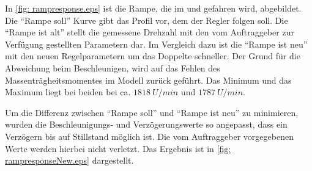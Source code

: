 \documentclass[./\jobname.tex]{subfiles}
\begin{document}
%
In \autoref{fig: rampresponse.eps} ist die Rampe, die im \modeA und \modeB gefahren wird, abgebildet. Die \enquote{Rampe soll} Kurve gibt das Profil vor, dem der Regler folgen soll. Die \enquote{Rampe ist alt} stellt die gemessene Drehzahl mit den vom Auftraggeber zur Verfügung gestellten Parametern dar. Im Vergleich dazu ist die \enquote{Rampe ist neu} mit den neuen Regelparametern um das Doppelte schneller. Der Grund für die Abweichung beim Beschleunigen, wird auf das Fehlen des Massenträgheitsmomentes im Modell zurück geführt. Das Minimum und das Maximum liegt bei beiden bei ca. \(1818~U/min\) und \(1787~U/min\).
%
\begin{figure}[H]
	\centering
	\noindent{}
	\label{fig: rampresponse.eps}
\end{figure}
%
Um die Differenz zwischen \enquote{Rampe soll} und \enquote{Rampe ist neu} zu minimieren, wurden die Beschleunigungs- und Verzögerungswerte so angepasst, dass ein Verzögern bis auf Stillstand möglich ist. Die vom Auftraggeber vorgegebenen Werte werden hierbei nicht verletzt. Das Ergebnis ist in \autoref{fig: rampresponseNew.eps} dargestellt.
%
\end{document}
